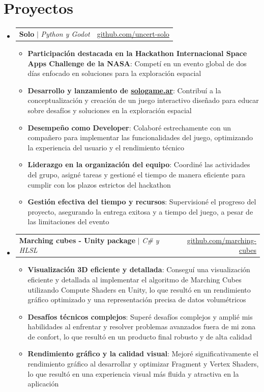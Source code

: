 \documentclass[letterpaper,11pt]{article}
\makeatletter
\newcommand{\resumeItem}[1]{
  \item\small{
    {#1 \vspace{-2pt}}
  }
}
\newcommand{\resumeProjectHeading}[2]{
    \item
    \begin{tabular*}{0.97\textwidth}{l@{\extracolsep{\fill}}r}
      #1 & #2 \\
    \end{tabular*}\vspace{-7pt}
}
\newcommand{\resumeSubHeadingListStart}{\begin{itemize}[leftmargin=0.15in, label={}]}
\newcommand{\resumeSubHeadingListEnd}{\end{itemize}}
\newcommand{\resumeItemListStart}{\begin{itemize}}
\newcommand{\resumeItemListEnd}{\end{itemize}\vspace{-5pt}}
\makeatother
\begin{document}
\section{Proyectos}
    \resumeSubHeadingListStart
        \resumeProjectHeading {\textbf{Solo} $|$ \emph{Python y Godot}}{\href{https://github.com/ptourne/uncert-titan}{github.com/uncert-solo}}
            \resumeItemListStart
                \resumeItem{\textbf{Participación destacada en la Hackathon Internacional Space Apps Challenge de la NASA}: Competí en un evento global de dos días enfocado en soluciones para la exploración espacial}
                \resumeItem{\textbf{Desarrollo y lanzamiento de \href{https://sologame.ar}{sologame.ar}}: Contribuí a la conceptualización y creación de un juego interactivo diseñado para educar sobre desafíos y soluciones en la exploración espacial}
                \resumeItem{\textbf{Desempeño como Developer}: Colaboré estrechamente con un compañero para implementar las funcionalidades del juego, optimizando la experiencia del usuario y el rendimiento técnico}
                \resumeItem{\textbf{Liderazgo en la organización del equipo}: Coordiné las actividades del grupo, asigné tareas y gestioné el tiempo de manera eficiente para cumplir con los plazos estrictos del hackathon}
                \resumeItem{\textbf{Gestión efectiva del tiempo y recursos}: Supervisioné el progreso del proyecto, asegurando la entrega exitosa y a tiempo del juego, a pesar de las limitaciones del evento}
            \resumeItemListEnd

      \resumeProjectHeading {\textbf{Marching cubes - Unity package} $|$ \emph{C\# y HLSL}}{\href{https://github.com/It-is-not-only-me/com.itisnotonlyme.marching-cubes}{github.com/marching-cubes}}
            \resumeItemListStart
                \resumeItem{\textbf{Visualización 3D eficiente y detallada}: Conseguí una visualización eficiente y detallada al implementar el algoritmo de Marching Cubes utilizando Compute Shaders en Unity, lo que resultó en un rendimiento gráfico optimizado y una representación precisa de datos volumétricos}
                \resumeItem{\textbf{Desafíos técnicos complejos}: Superé desafíos complejos y amplié mis habilidades al enfrentar y resolver problemas avanzados fuera de mi zona de confort, lo que resultó en un producto final robusto y de alta calidad}
                \resumeItem{\textbf{Rendimiento gráfico y la calidad visual}: Mejoré significativamente el rendimiento gráfico al desarrollar y optimizar Fragment y Vertex Shaders, lo que resultó en una experiencia visual más fluida y atractiva en la aplicación}
            \resumeItemListEnd
    \resumeSubHeadingListEnd
\end{document}
